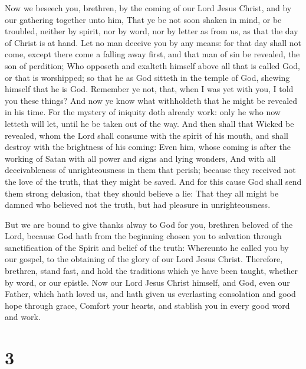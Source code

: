  Now we beseech you, brethren, by the coming of our Lord
Jesus Christ, and by our gathering together unto him,  That
ye be not soon shaken in mind, or be troubled, neither by spirit, nor by
word, nor by letter as from us, as that the day of Christ is at hand.
 Let no man deceive you by any means: for that day shall not
come, except there come a falling away first, and that man of sin be
revealed, the son of perdition;  Who opposeth and exalteth
himself above all that is called God, or that is worshipped; so that he
as God sitteth in the temple of God, shewing himself that he is God.
 Remember ye not, that, when I was yet with you, I told you
these things?  And now ye know what withholdeth that he
might be revealed in his time.  For the mystery of iniquity
doth already work: only he who now letteth will let, until he be taken
out of the way.  And then shall that Wicked be revealed,
whom the Lord shall consume with the spirit of his mouth, and shall
destroy with the brightness of his coming:  Even him, whose
coming is after the working of Satan with all power and signs and lying
wonders,  And with all deceivableness of unrighteousness in
them that perish; because they received not the love of the truth, that
they might be saved.  And for this cause God shall send
them strong delusion, that they should believe a lie:  That
they all might be damned who believed not the truth, but had pleasure in
unrighteousness.

 But we are bound to give thanks alway to God for you,
brethren beloved of the Lord, because God hath from the beginning chosen
you to salvation through sanctification of the Spirit and belief of the
truth:  Whereunto he called you by our gospel, to the
obtaining of the glory of our Lord Jesus Christ. 
Therefore, brethren, stand fast, and hold the traditions which ye have
been taught, whether by word, or our epistle.  Now our Lord
Jesus Christ himself, and God, even our Father, which hath loved us, and
hath given us everlasting consolation and good hope through grace,
 Comfort your hearts, and stablish you in every good word
and work.

\hypertarget{section-2}{%
\section{3}\label{section-2}}

